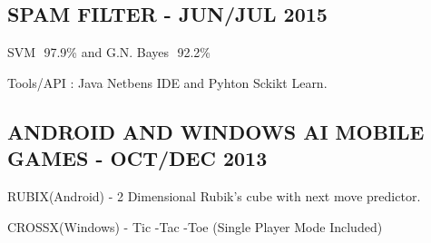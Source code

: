 \documentclass[]{deedy-resume-openfont}
\begin{document}
\begin{minipage}[t]{0.66\textwidth}
\subsection{SPAM FILTER - JUN/JUL 2015}
\begin{tightemize}
\item  SVM ­ 97.9\% and G.N. Bayes ­ 92.2\%
\item Tools/API : Java Netbens IDE and Pyhton Sckikt Learn.
\end{tightemize}
\sectionsep

\subsection{ANDROID AND WINDOWS AI MOBILE GAMES - OCT/DEC 2013}
\vspace{\topsep} %
\begin{tightemize}
\item RUBIX(Android) - 2 Dimensional Rubik's cube with next move predictor.
\item CROSSX(Windows) - Tic -Tac -Toe (Single Player Mode Included)
\end{tightemize}
\sectionsep


\sectionsep



\sectionsep



\end{minipage}
\end{document}
